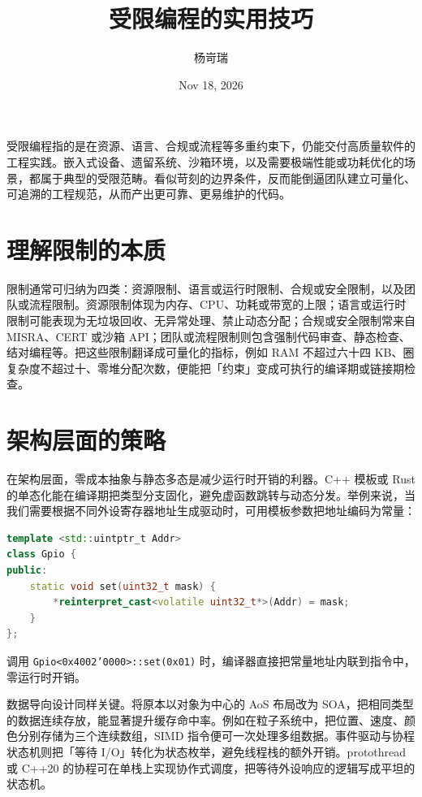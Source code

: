 \title{受限编程的实用技巧}
\author{杨岢瑞}
\date{Nov 18, 2026}
\maketitle
受限编程指的是在资源、语言、合规或流程等多重约束下，仍能交付高质量软件的工程实践。嵌入式设备、遗留系统、沙箱环境，以及需要极端性能或功耗优化的场景，都属于典型的受限范畴。看似苛刻的边界条件，反而能倒逼团队建立可量化、可追溯的工程规范，从而产出更可靠、更易维护的代码。\par
\chapter{理解限制的本质}
限制通常可归纳为四类：资源限制、语言或运行时限制、合规或安全限制，以及团队或流程限制。资源限制体现为内存、CPU、功耗或带宽的上限；语言或运行时限制可能表现为无垃圾回收、无异常处理、禁止动态分配；合规或安全限制常来自 MISRA、CERT 或沙箱 API；团队或流程限制则包含强制代码审查、静态检查、结对编程等。把这些限制翻译成可量化的指标，例如 RAM 不超过六十四 KB、圈复杂度不超过十、零堆分配次数，便能把「约束」变成可执行的编译期或链接期检查。\par
\chapter{架构层面的策略}
在架构层面，零成本抽象与静态多态是减少运行时开销的利器。C++ 模板或 Rust 的单态化能在编译期把类型分支固化，避免虚函数跳转与动态分发。举例来说，当我们需要根据不同外设寄存器地址生成驱动时，可用模板参数把地址编码为常量：\par
\begin{lstlisting}[language=cpp]
template <std::uintptr_t Addr>
class Gpio {
public:
    static void set(uint32_t mask) {
        *reinterpret_cast<volatile uint32_t*>(Addr) = mask;
    }
};
\end{lstlisting}
调用 \texttt{Gpio<0x4002'0000>::set(0x01)} 时，编译器直接把常量地址内联到指令中，零运行时开销。\par
数据导向设计同样关键。将原本以对象为中心的 AoS 布局改为 SOA，把相同类型的数据连续存放，能显著提升缓存命中率。例如在粒子系统中，把位置、速度、颜色分别存储为三个连续数组，SIMD 指令便可一次处理多组数据。事件驱动与协程状态机则把「等待 I/O」转化为状态枚举，避免线程栈的额外开销。protothread 或 C++20 的协程可在单栈上实现协作式调度，把等待外设响应的逻辑写成平坦的状态机。\par
